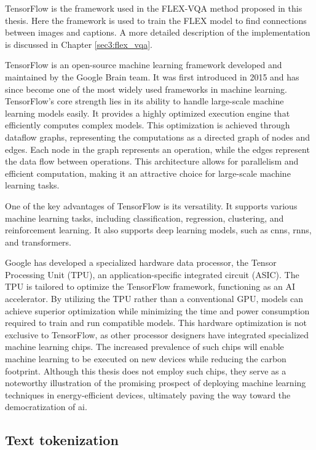     TensorFlow is the framework used in the FLEX-VQA method proposed in this thesis. Here the framework is used to train the FLEX model to find connections between images and captions. A more detailed description of the implementation is discussed in Chapter \ref{sec3:flex_vqa}.

    
    TensorFlow is an open-source machine learning framework developed and maintained by the Google Brain team. It was first introduced in 2015 and has since become one of the most widely used frameworks in machine learning.
    TensorFlow's core strength lies in its ability to handle large-scale machine learning models easily. It provides a highly optimized execution engine that efficiently computes complex models. This optimization is achieved through dataflow graphs, representing the computations as a directed graph of nodes and edges. Each node in the graph represents an operation, while the edges represent the data flow between operations. This architecture allows for parallelism and efficient computation, making it an attractive choice for large-scale machine learning tasks.
    
    One of the key advantages of TensorFlow is its versatility. It supports various machine learning tasks, including classification, regression, clustering, and reinforcement learning. It also supports deep learning models, such as \glspl{cnn}, \glspl{rnn}, and transformers.

    
    
    Google has developed a specialized hardware data processor, the Tensor Processing Unit (TPU), an application-specific integrated circuit (ASIC). The TPU is tailored to optimize the TensorFlow framework, functioning as an AI accelerator. By utilizing the TPU rather than a conventional GPU, models can achieve superior optimization while minimizing the time and power consumption required to train and run compatible models. This hardware optimization is not exclusive to TensorFlow, as other processor designers have integrated specialized machine learning chips. The increased prevalence of such chips will enable machine learning to be executed on new devices while reducing the carbon footprint. Although this thesis does not employ such chips, they serve as a noteworthy illustration of the promising prospect of deploying machine learning techniques in energy-efficient devices, ultimately paving the way toward the democratization of \gls{ai}.


    

    \subsection{Text tokenization}

